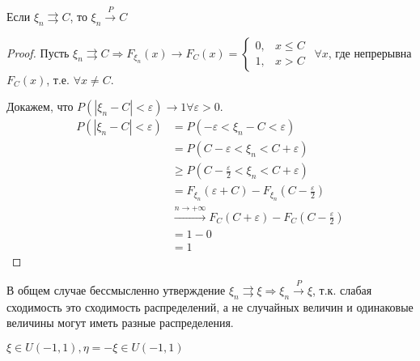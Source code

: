 \begin{theorem}
    Если \(\xi_n \rightrightarrows C\), то \(\xi_n \xrightarrow{P} C\)
\end{theorem}
\begin{proof}
    Пусть \(\xi_n \rightrightarrows C \Rightarrow F_{\xi_n}(x) \to F_C(x) = \begin{cases}
        0, & x \leq C \\
        1, & x > C
    \end{cases} \ \ \forall x\), где непрерывна \(F_C(x)\), т.е. \(\forall x \neq C\).

    Докажем, что \(P(|\xi_n - C| < \varepsilon) \to 1 \forall \varepsilon > 0\).
    \begin{align}
        P(|\xi_n - C| < \varepsilon) & = P( - \varepsilon < \xi_n - C < \varepsilon)                                                  \\
                                     & = P(C - \varepsilon < \xi_n < C + \varepsilon)                                                 \\
                                     & \geq P(C - \frac{\varepsilon}{2} < \xi_n < C + \varepsilon)                                    \\
                                     & = F_{\xi_n}(\varepsilon + C) - F_{\xi_n}\left( C - \frac{\varepsilon}{2} \right)               \\
                                     & \xrightarrow{n \to +\infty} F_C(C + \varepsilon) - F_C\left( C - \frac{\varepsilon}{2} \right) \\
                                     & = 1 - 0                                                                                        \\
                                     & = 1
    \end{align}
\end{proof}

\begin{remark}
    В общем случае бессмысленно утверждение \(\xi_n \rightrightarrows \xi \Rightarrow \xi_n \xrightarrow{P} \xi\), т.к. слабая сходимость это сходимость распределений, а не случайных величин и одинаковые величины могут иметь разные распределения.
\end{remark}

\begin{example}
    \(\xi \in U( - 1, 1), \eta = - \xi \in U( - 1, 1)\)
\end{example}

